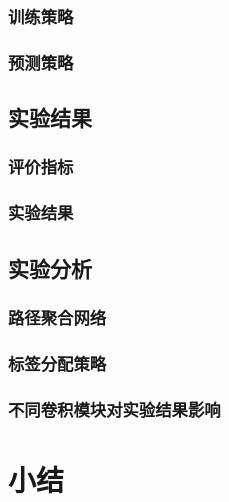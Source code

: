 \subsubsection{训练策略}
\subsubsection{预测策略}

\subsection{实验结果}
\subsubsection{评价指标} 
\subsubsection{实验结果}

\subsection{实验分析}
\subsubsection{路径聚合网络}
\subsubsection{标签分配策略}
\subsubsection{不同卷积模块对实验结果影响}
\section{小结}


